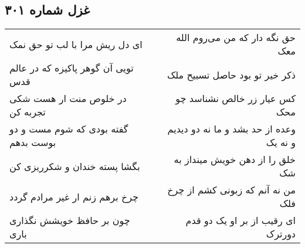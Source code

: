 \begin{center}
\section*{غزل شماره ۳۰۱}
\label{sec:sh301}
\begin{longtable}{l p{0.5cm} r}
ای دل ریش مرا با لب تو حق نمک
&&
حق نگه دار که من می‌روم الله معک
\\
تویی آن گوهر پاکیزه که در عالم قدس
&&
ذکر خیر تو بود حاصل تسبیح ملک
\\
در خلوص منت ار هست شکی تجربه کن
&&
کس عیار زر خالص نشناسد چو محک
\\
گفته بودی که شوم مست و دو بوست بدهم
&&
وعده از حد بشد و ما نه دو دیدیم و نه یک
\\
بگشا پسته خندان و شکرریزی کن
&&
خلق را از دهن خویش مینداز به شک
\\
چرخ برهم زنم ار غیر مرادم گردد
&&
من نه آنم که زبونی کشم از چرخ فلک
\\
چون بر حافظ خویشش نگذاری باری
&&
ای رقیب از بر او یک دو قدم دورترک
\\
\end{longtable}
\end{center}
